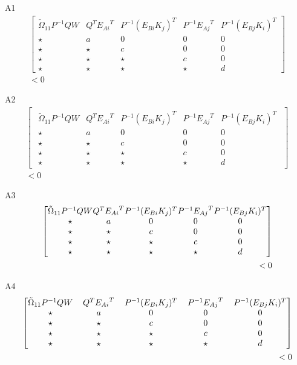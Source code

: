 \documentclass[a4paper]{article}
\begin{document}
\indent A1
\begin{align}
	\begin{bmatrix}\tilde
		{\Omega}_{11}P^{-1}QW&
		Q^T{E_{Ai}}^T&
		P^{-1}(E_{Bi}K_j)^T&
		P^{-1}{E_{Aj}}^T&
		P^{-1}(E_{Bj}K_i)^T\\
		\star & a & 0 & 0 & 0\\
		\star & \star & c & 0 & 0\\
		\star & \star & \star & c & 0\\
		\star & \star & \star &\star & d
	\end{bmatrix}\nonumber\\<0
\end{align}

\indent A2
\begin{align}
	\begin{bmatrix}
		\begin{smallmatrix}\tilde
			{\Omega}_{11}P^{-1}QW
			&Q^T{E_{Ai}}^T
			&P^{-1}(E_{Bi}K_j)^T
			&P^{-1}{E_{Aj}}^T
			&P^{-1}(E_{Bj}K_i)^T\\
			\star&a&0&0&0\\
			\star&\star&c&0&0\\
			\star&\star&\star&c&0\\
			\star&\star&\star&\star&d
		\end{smallmatrix}
	\end{bmatrix}\nonumber\\<0
\end{align}

\indent A3
\begin{align}
	\setlength{\arraycolsep}{0.2pt}
	\begin{bmatrix}\tilde
		{\Omega}_{11}P^{-1}QW
		&Q^T{E_{Ai}}^T
		&P^{-1}(E_{Bi}K_j)^T
		&P^{-1}{E_{Aj}}^T
		&P^{-1}(E_{Bj}K_i)^T\\
		\star&a&0&0&0\\
		\star&\star&c&0&0\\
		\star&\star&\star&c&0\\
		\star&\star&\star&\star&d
	\end{bmatrix}\nonumber\\<0
\end{align}

\indent A4
\begin{align}
	\setlength{\arraycolsep}{6pt}
	\begin{bmatrix}\tilde
		{\Omega}_{11}P^{-1}QW
		&Q^T{E_{Ai}}^T
		&P^{-1}(E_{Bi}K_j)^T
		&P^{-1}{E_{Aj}}^T
		&P^{-1}(E_{Bj}K_i)^T\\
		\star&a&0&0&0\\
		\star&\star&c&0&0\\
		\star&\star&\star&c&0\\
		\star&\star&\star&\star&d
	\end{bmatrix}\nonumber\\<0
\end{align}
\end{document}
